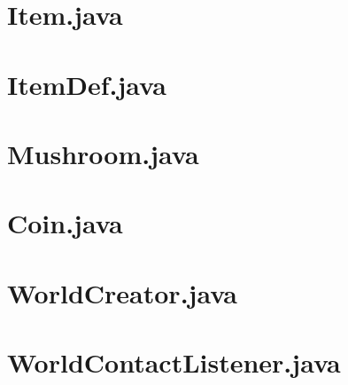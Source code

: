 \documentclass{article}
\begin{document}
	
	\section*{Item.java}
	
	\newpage
	
	\section*{ItemDef.java}
	
	\newpage
	
	\section*{Mushroom.java}
	
	\newpage
	
	\section*{Coin.java}
	
	\newpage
	
	
	\section*{WorldCreator.java}
	
	\newpage
	
	\section*{WorldContactListener.java}
	
	
	
\end{document}
